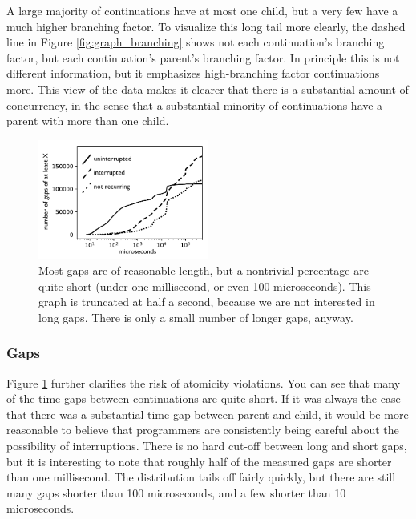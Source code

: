 \documentclass[sigplan,10pt,review,anonymous]{acmart}\settopmatter{printfolios=true,printccs=false,printacmref=false}
\begin{document}
A large majority of continuations have at most one child, but a very few have a much higher branching factor.
To visualize this long tail more clearly, the dashed line in Figure \ref{fig:graph_branching} shows not each continuation's branching factor, but each continuation's parent's branching factor.
In principle this is not different information, but it emphasizes high-branching factor continuations more.
This view of the data makes it clearer that there is a substantial amount of concurrency, in the sense that a substantial minority of continuations have a parent with more than one child.

\begin{figure}
\hspace*{-0.2cm}\includegraphics[width=0.5\textwidth]{gaps_graph_bw}
\caption{Most gaps are of reasonable length, but a nontrivial percentage are quite short (under one millisecond, or even 100 microseconds).
  This graph is truncated at half a second, because we are not interested in long gaps.
  There is only a small number of longer gaps, anyway.}
\label{fig:graph_gaps}
\end{figure}

\subsubsection{Gaps}

Figure \ref{fig:graph_gaps} further clarifies the risk of atomicity violations.
You can see that many of the time gaps between continuations are quite short.
If it was always the case that there was a substantial time gap between parent and child, it would be more reasonable to believe that programmers are consistently being careful about the possibility of interruptions.
There is no hard cut-off between long and short gaps, but it is interesting to note that roughly half of the measured gaps are shorter than one millisecond.
The distribution tails off fairly quickly, but there are still many gaps shorter than 100 microseconds, and a few shorter than 10 microseconds.
\end{document}
